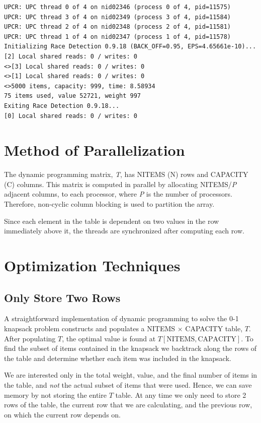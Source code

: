 \documentclass[11pt]{article} %
\begin{document}
{\tiny
\begin{lstlisting}
UPCR: UPC thread 0 of 4 on nid02346 (process 0 of 4, pid=11575)
UPCR: UPC thread 3 of 4 on nid02349 (process 3 of 4, pid=11584)
UPCR: UPC thread 2 of 4 on nid02348 (process 2 of 4, pid=11581)
UPCR: UPC thread 1 of 4 on nid02347 (process 1 of 4, pid=11578)
Initializing Race Detection 0.9.18 (BACK_OFF=0.95, EPS=4.65661e-10)...
[2] Local shared reads: 0 / writes: 0
<>[3] Local shared reads: 0 / writes: 0
<>[1] Local shared reads: 0 / writes: 0
<>5000 items, capacity: 999, time: 8.58934
75 items used, value 52721, weight 997
Exiting Race Detection 0.9.18...
[0] Local shared reads: 0 / writes: 0
\end{lstlisting}
}

\section{Method of Parallelization}

The dynamic programming matrix, \emph{T}, has NITEMS (N) rows and CAPACITY (C) columns. This matrix is computed in parallel by allocating NITEMS/\emph{P} adjacent columns, to each processor, where \emph{P} is the number of processors. Therefore, non-cyclic column blocking is used to partition the array.

Since each element in the table is dependent on two values in the row immediately above it, the threads are synchronized after computing each row.

\section{Optimization Techniques}

\subsection{Only Store Two Rows}
A straightforward implementation of dynamic programming to solve the 0-1 knapsack problem constructs and populates a NITEMS $\times$ CAPACITY table, $T$. After populating $T$, the optimal value is found at $T[\text{NITEMS}, \text{CAPACITY}]$. To find the subset of items contained in the knapsack we backtrack along the rows of the table and determine whether each item was included in the knapsack. 

We are interested only in the total weight, value, and the final number of items in the table, and \emph{not} the actual subset of items that were used. Hence, we can save memory by not storing the entire $T$ table. At any time we only need to store 2 rows of the table, the current row that we are calculating, and the previous row, on which the current row depends on.
\end{document}
